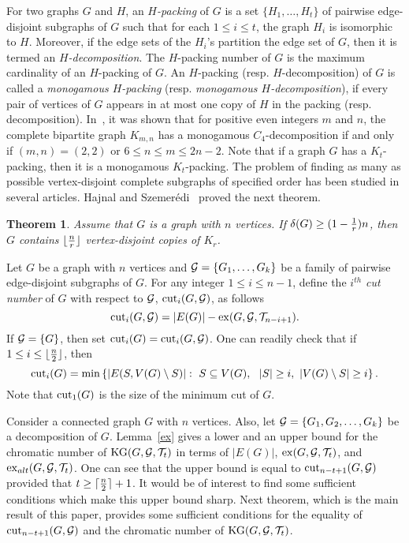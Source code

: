 \documentclass[11pt]{article}
\newtheorem{prealphthm}{{\bf Theorem}}
\newenvironment{alphthm}{\begin{prealphthm}{\hspace{-0.5
               em}{\bf.\ }}}{\end{prealphthm}}
\begin{document}
For two graphs $G$ and $H$, an {\it $H$-packing} of $G$ is a set $\{H_1,\ldots,H_t\}$ of pairwise edge-disjoint subgraphs of $G$ such that for each $1 \leq i \leq t$, the graph $H_i$ is isomorphic to $H$. 
Moreover, if the edge sets of the $H_i$'s partition the edge set of $G$, then it is termed an {\it $H$-decomposition}. 
The $H$-packing number of $G$ is the maximum cardinality of an $H$-packing of $G$. An $H$-packing (resp. $H$-decomposition) of $G$  is called a {\it monogamous $H$-packing} (resp. {\it monogamous $H$-decomposition}), if every pair of vertices of $G$ appears in at most one copy of $H$ in the packing (resp. decomposition). In~\cite{MR1723879}, it was shown that for positive even integers 
$m$ and $n$, the complete bipartite graph $K_{m,n}$ has a  monogamous $C_4$-decomposition if and only if $(m,n)=(2,2)$ or $6\leq n\leq m\leq 2n-2$. Note that if a graph $G$ has a $K_t$-packing, then it is a monogamous $K_t$-packing. 
The problem of finding as many as possible vertex-disjoint complete subgraphs of specified order
has been studied in several articles. Hajnal and Szemer{\'e}di~\cite{MR0297607} proved the next theorem. 
\begin{alphthm}{\rm \cite{MR0297607}}\label{Hajnal}
Assume that $G$ is a graph with $n$ vertices.
If $\delta(G) \geq (1-{1\over r})n$, then $G$ contains $\lfloor{n\over r}\rfloor$ 
vertex-disjoint copies of $K_r$.
\end{alphthm} 
Let $G$ be a graph with $n$ vertices and ${\cal G}=\{G_1,\ldots,G_k\}$ be a family of pairwise edge-disjoint subgraphs of $G$.
For any integer $1\leq i\leq n-1$, define the {\it $i^{th}$ cut number} of $G$ with respect to ${\cal G}$, ${\rm cut}_i(G, {\cal G})$,  as follows
$${\rm cut}_i(G, {\cal G})=|E(G)|-{\rm ex}(G, {\cal G}, {\cal T}_{n-i+1}).$$
If ${\cal G}=\{G\}$, then set ${\rm cut}_i(G)={\rm cut}_i(G, {\cal G})$. One can readily check that if  
$1\leq i \leq \lfloor {n\over 2}\rfloor$, then
$${\rm cut}_i(G)=\min\left\{|E(S,V(G)\setminus S)|:\ S\subseteq V(G),\ \ |S|\geq i,\ |V(G)\setminus S|\geq i \right\}.$$
Note that ${\rm cut}_1(G)$ is the size of the minimum cut of $G$. 

Consider a connected graph $G$ with $n$ vertices. Also, let ${\cal G}=\{G_1,G_2,\ldots,G_k\}$ 
be a decomposition of $G$. 
Lemma~\ref{ex} gives a lower and an upper bound for the chromatic number of ${\rm KG}(G,{\cal G}, {\cal T}_t)$ in terms of $|E(G)|$, ${\rm ex}(G, {\cal G}, {\cal T}_{t})$, and ${\rm ex}_{alt}(G, {\cal G}, {\cal T}_{t})$. One can see that 
the upper bound is equal to ${\rm cut}_{n-t+1}(G, {\cal G})$ provided that $t\geq \lceil{n\over 2}\rceil+1$.  
It would be of interest to find some sufficient conditions which make this upper bound sharp.
Next theorem, which is the main result of this paper, provides some sufficient conditions 
for the equality of  ${\rm cut}_{n-t+1}(G, {\cal G})$ and the chromatic number of ${\rm KG}(G,{\cal G}, {\cal T}_t)$. 
\end{document}
